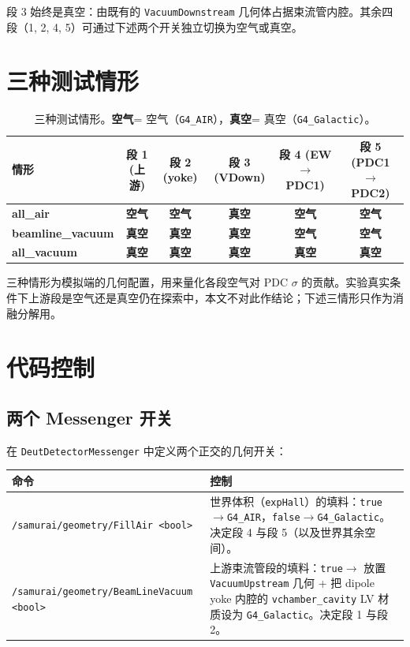 \documentclass[a4paper, 11pt]{article}
\newcommand{\air}{\textcolor{airorange}{\textbf{空气}}}
\newcommand{\vac}{\textcolor{vacblue}{\textbf{真空}}}
\begin{document}
段 3 始终是真空：由既有的 \texttt{VacuumDownstream} 几何体占据束流管内腔。其余四段（1, 2, 4, 5）可通过下述两个开关独立切换为空气或真空。

\section{三种测试情形}

\begin{table}[H]
\centering
\caption{三种测试情形。\air = 空气（\texttt{G4\_AIR}），\vac = 真空（\texttt{G4\_Galactic}）。}
\label{tab:conditions}
\begin{tabular}{lccccc}
\toprule
情形 & 段 1 (上游) & 段 2 (yoke) & 段 3 (VDown) & 段 4 (EW$\to$PDC1) & 段 5 (PDC1$\to$PDC2) \\
\midrule
\textbf{all\_air}          & \air & \air & \vac & \air & \air \\
\textbf{beamline\_vacuum}  & \vac & \vac & \vac & \air & \air \\
\textbf{all\_vacuum}       & \vac & \vac & \vac & \vac & \vac \\
\bottomrule
\end{tabular}
\end{table}

三种情形为模拟端的几何配置，用来量化各段空气对 PDC $\sigma$ 的贡献。实验真实条件下上游段是空气还是真空仍在探索中，本文不对此作结论；下述三情形只作为消融分解用。

\section{代码控制}

\subsection{两个 Messenger 开关}

在 \texttt{DeutDetectorMessenger} 中定义两个正交的几何开关：

\begin{center}
\begin{tabular}{lp{10cm}}
\toprule
命令 & 控制 \\
\midrule
\verb|/samurai/geometry/FillAir <bool>|        & 世界体积（\texttt{expHall}）的填料：\texttt{true}$\to$\texttt{G4\_AIR}，\texttt{false}$\to$\texttt{G4\_Galactic}。决定段 4 与段 5（以及世界其余空间）。 \\
\verb|/samurai/geometry/BeamLineVacuum <bool>| & 上游束流管段的填料：\texttt{true}$\to$ 放置 \texttt{VacuumUpstream} 几何 + 把 dipole yoke 内腔的 \texttt{vchamber\_cavity} LV 材质设为 \texttt{G4\_Galactic}。决定段 1 与段 2。 \\
\bottomrule
\end{tabular}
\end{center}
\end{document}
